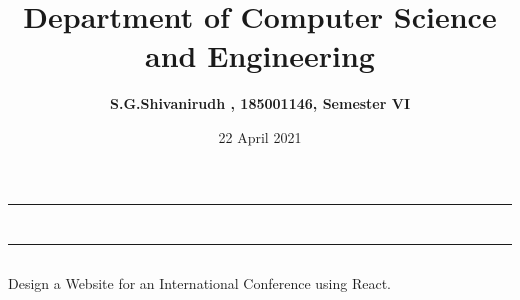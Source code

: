 \documentclass[12pt,letterpaper]{article}
\title{\textbf{Department of Computer Science and Engineering}}
\author{\textbf{S.G.Shivanirudh , 185001146, Semester VI }}
\date{22 April 2021}
\begin{document}
\maketitle
\hrule
\section*{}
\hrule 
\bigskip\bigskip

\subsection*{}

\subsection*{}
\begin{flushleft}
    Design a Website for an International Conference using React.
\end{flushleft}

\subsection*{}
\subsubsection*{}
\begin{flushleft}

\end{flushleft}

\subsubsection*{}
\subsubsection*{}
\begin{flushleft}

\end{flushleft}

\subsubsection*{}
\begin{flushleft}

\end{flushleft}
\end{document}
